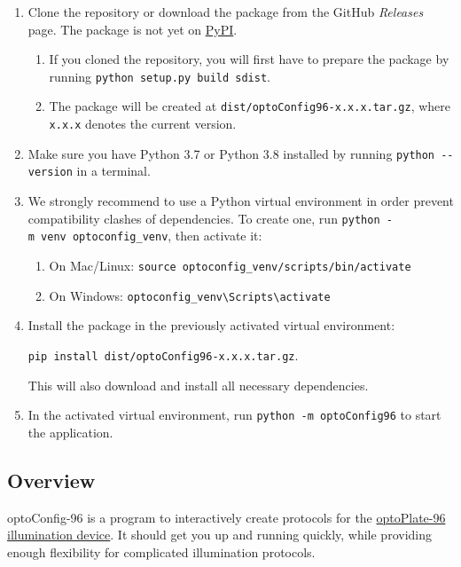 \begin{enumerate}
\def\labelenumi{\arabic{enumi}.}
\item
  Clone the repository or download the package from the GitHub
  \emph{Releases} page. The package is not yet on
  \href{https://www.pypi.org}{PyPI}.

  \begin{enumerate}
  \def\labelenumii{\arabic{enumii}.}
  \tightlist
  \item
    If you cloned the repository, you will first have to prepare the
    package by running \texttt{python\ setup.py\ build\ sdist}.
  \item
    The package will be created at
    \texttt{dist/optoConfig96-x.x.x.tar.gz}, where \texttt{x.x.x}
    denotes the current version.
  \end{enumerate}
\item
  Make sure you have Python 3.7 or Python 3.8 installed by running
  \texttt{python\ -\/-version} in a terminal.
\item
  We strongly recommend to use a Python virtual environment in order
  prevent compatibility clashes of dependencies. To create one, run
  \texttt{python\ -m\ venv\ optoconfig\_venv}, then activate it:

  \begin{enumerate}
  \def\labelenumii{\arabic{enumii}.}
  \tightlist
  \item
    On Mac/Linux: \texttt{source\ optoconfig\_venv/scripts/bin/activate}
  \item
    On Windows:
    \texttt{optoconfig\_venv\textbackslash{}Scripts\textbackslash{}activate}
  \end{enumerate}
\item
  Install the package in the previously activated virtual environment:

  \texttt{pip\ install\ dist/optoConfig96-x.x.x.tar.gz}.

  This will also download and install all necessary dependencies.
\item
  In the activated virtual environment, run
  \texttt{python\ -m\ optoConfig96} to start the application.
\end{enumerate}

\hypertarget{overview}{%
\subsection{Overview}\label{overview}}

optoConfig-96 is a program to interactively create protocols for the
\href{https://www.nature.com/articles/s41596-019-0178-y}{optoPlate-96
illumination device}. It should get you up and running quickly, while
providing enough flexibility for complicated illumination protocols.

